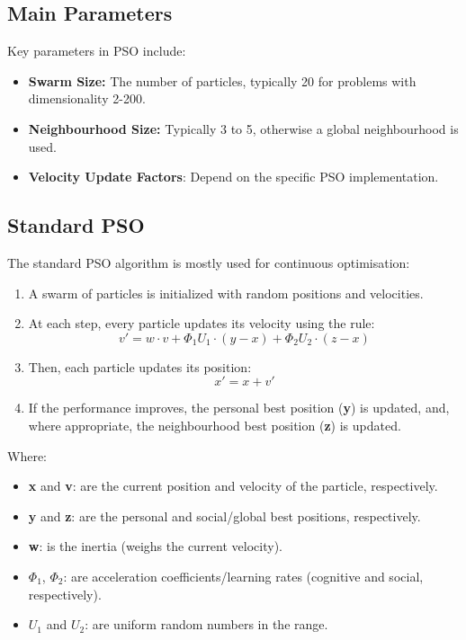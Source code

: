 \subsection*{Main Parameters}
Key parameters in PSO include:

\begin{itemize}
    \item \textbf{Swarm Size:} The number of particles, typically 20 for problems with dimensionality 2-200.
    \item \textbf{Neighbourhood Size:} Typically 3 to 5, otherwise a global neighbourhood is used.
    \item \textbf{Velocity Update Factors}: Depend on the specific PSO implementation.
\end{itemize}

\subsection*{Standard PSO}
The standard PSO algorithm is mostly used for continuous optimisation:
\begin{enumerate}
    \item A swarm of particles is initialized with random positions and velocities.
    \item At each step, every particle updates its velocity using the rule:
    $$ v' = w \cdot v + \Phi_1 U_1 \cdot (y - x) + \Phi_2 U_2 \cdot (z - x) $$
    \item Then, each particle updates its position: $$ x' = x + v' $$
    \item If the performance improves, the personal best position (\textbf{y}) is updated, and, where appropriate, the neighbourhood best position (\textbf{z}) is updated.
\end{enumerate}

Where:
\begin{itemize}
    \item \textbf{x} and \textbf{v}: are the current position and velocity of the particle, respectively.
    \item \textbf{y} and \textbf{z}: are the personal and social/global best positions, respectively.
    \item \textbf{w}: is the inertia (weighs the current velocity).
    \item \textbf{$\Phi_1$}, \textbf{$\Phi_2$}: are acceleration coefficients/learning rates (cognitive and social, respectively).
    \item \textbf{$U_1$} and \textbf{$U_2$}: are uniform random numbers in the range.
\end{itemize}


